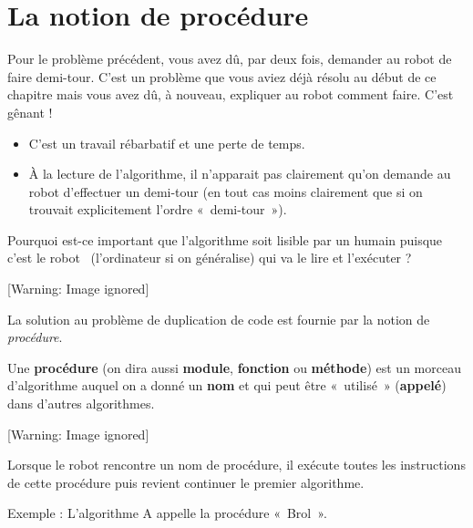 \section{La notion de procédure}
{
Pour le problème précédent, vous avez dû, par deux fois, demander au
robot de faire demi-tour. C'est un problème que vous
aviez déjà résolu au début de ce chapitre mais vous avez dû, à nouveau,
expliquer au robot comment faire. C'est gênant !}

\liststyleListv
\begin{itemize}
\item {
C'est un travail rébarbatif et une perte de temps.}
\item {
À la lecture de l'algorithme, il
n'apparait pas clairement qu'on
demande au robot d'effectuer un demi-tour (en tout cas
moins clairement que si on trouvait explicitement
l'ordre «~demi-tour~»).}
\end{itemize}
{
Pourquoi est-ce important que l'algorithme soit lisible
par un humain puisque c'est le robot
\ (l'ordinateur si on généralise) qui va le lire et
l'exécuter ?}

\begin{center}
 [Warning: Image ignored] %

\end{center}
{
La solution au problème de duplication de code est fournie par la notion
de \textit{procédure}.}

{
Une \textbf{procédure} (on dira aussi \textbf{module}, \textbf{fonction}
ou \textbf{méthode}) est un morceau d'algorithme
auquel on a donné un \textbf{nom} et qui peut être «~utilisé~»
(\textbf{appelé}) dans d'autres algorithmes.}

\begin{center}
 [Warning: Image ignored] %

\end{center}
{
Lorsque le robot rencontre un nom de procédure, il exécute toutes les
instructions de cette procédure puis revient continuer le premier
algorithme.}

{
Exemple : L'algorithme A appelle la procédure
«~Brol~».}



